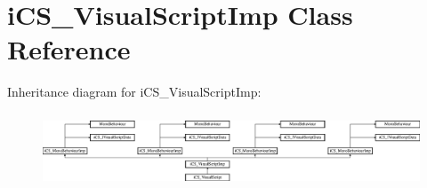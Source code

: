 \hypertarget{classi_c_s___visual_script_imp}{\section{i\+C\+S\+\_\+\+Visual\+Script\+Imp Class Reference}
\label{classi_c_s___visual_script_imp}
}
Inheritance diagram for i\+C\+S\+\_\+\+Visual\+Script\+Imp\+:\begin{figure}[H]
\begin{center}
\leavevmode
\includegraphics[height=2.243590cm]{classi_c_s___visual_script_imp}
\end{center}
\end{figure}
